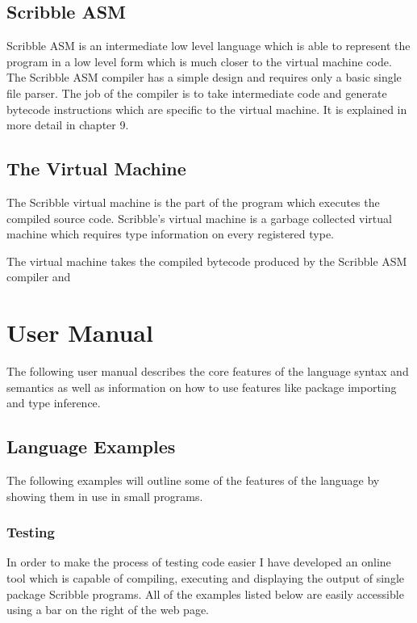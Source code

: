 \documentclass[]{final_report}
\begin{document}
\section{Scribble ASM}

Scribble ASM is an intermediate low level language which is able to represent the program in a low level form which is much closer to the virtual machine code. The Scribble ASM compiler has a simple design and requires only a basic single file parser. The job of the compiler is to take intermediate code and generate bytecode instructions which are specific to the virtual machine. It is explained in more detail in chapter 9.

\section{The Virtual Machine}

The Scribble virtual machine is the part of the program which executes the compiled source code. Scribble's virtual machine is a garbage collected virtual machine which requires type information on every registered type. 

The virtual machine takes the compiled bytecode produced by the Scribble ASM compiler and 

\chapter{User Manual}

The following user manual describes the core features of the language syntax and semantics as well as information on how to use features like package importing and type inference.

\section{Language Examples}

The following examples will outline some of the features of the language by showing them in use in small programs.

\subsection{Testing}

In order to make the process of testing code easier I have developed an online tool which is capable of compiling, executing and displaying the output of single package Scribble programs. All of the examples listed below are easily accessible using a bar on the right of the web page.
\end{document}
